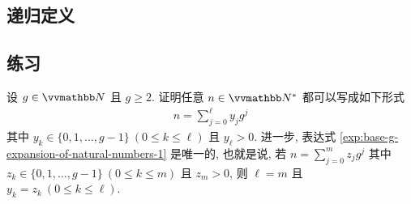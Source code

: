 \begin{example}\label{eg:mathematical-induction}
    
\end{example}

\begin{proposition}[完整归纳法]
    
\end{proposition}

\subsection{递归定义}

\begin{proposition}
    
\end{proposition}

\begin{example}
    
\end{example}

\begin{remark}
    
\end{remark}

\begin{example}\label{eg:recursive-definition-for-power-and-factorial}
    
\end{example}

\subsection{练习}

\begin{exercise}\label{ex:base-g-expansion-of-natural-numbers}
    设 \(g \in \N\) 且 \(g \geq 2\). 证明任意 \(n \in \N^\ast\) 都可以写成如下形式
    \begin{align}\label{exp:base-g-expansion-of-natural-numbers-1}
        n = \sum_{j = 0}^\ell y_j g^j
    \end{align}
    其中 \(y_k \in \{0, 1, \ldots, g - 1\}\ (0 \leq k \leq \ell)\) 且 \(y_\ell > 0\). 进一步, 表达式 \eqref{exp:base-g-expansion-of-natural-numbers-1} 是唯一的, 也就是说, 若 \(n = \sum_{j = 0}^m z_j g^j\) 其中 \(z_k \in \{0, 1, \ldots, g - 1\}\ (0 \leq k \leq m)\) 且 \(z_m > 0\), 则 \(\ell = m\) 且 \(y_k = z_k\ (0 \leq k \leq \ell)\).
\end{exercise}

\newpage

